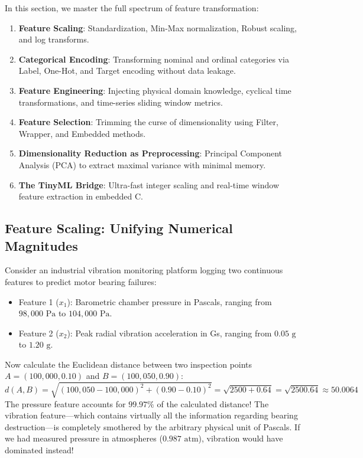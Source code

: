 In this section, we master the full spectrum of feature transformation:
\begin{enumerate}
    \item \textbf{Feature Scaling}: Standardization, Min-Max normalization, Robust scaling, and log transforms.
    \item \textbf{Categorical Encoding}: Transforming nominal and ordinal categories via Label, One-Hot, and Target encoding without data leakage.
    \item \textbf{Feature Engineering}: Injecting physical domain knowledge, cyclical time transformations, and time-series sliding window metrics.
    \item \textbf{Feature Selection}: Trimming the curse of dimensionality using Filter, Wrapper, and Embedded methods.
    \item \textbf{Dimensionality Reduction as Preprocessing}: Principal Component Analysis (PCA) to extract maximal variance with minimal memory.
    \item \textbf{The TinyML Bridge}: Ultra-fast integer scaling and real-time window feature extraction in embedded C.
\end{enumerate}

\subsection{Feature Scaling: Unifying Numerical Magnitudes}\label{subsec:feature_scaling}

Consider an industrial vibration monitoring platform logging two continuous features to predict motor bearing failures:
\begin{itemize}
    \item Feature 1 ($x_1$): Barometric chamber pressure in Pascals, ranging from $98{,}000\text{ Pa}$ to $104{,}000\text{ Pa}$.
    \item Feature 2 ($x_2$): Peak radial vibration acceleration in Gs, ranging from $0.05\text{ g}$ to $1.20\text{ g}$.
\end{itemize}

Now calculate the Euclidean distance between two inspection points $A = (100{,}000, 0.10)$ and $B = (100{,}050, 0.90)$:
\begin{equation*}
d(A, B) = \sqrt{(100{,}050 - 100{,}000)^2 + (0.90 - 0.10)^2} = \sqrt{2500 + 0.64} = \sqrt{2500.64} \approx 50.0064
\end{equation*}
The pressure feature accounts for $99.97\%$ of the calculated distance! The vibration feature---which contains virtually all the information regarding bearing destruction---is completely smothered by the arbitrary physical unit of Pascals. If we had measured pressure in atmospheres ($0.987\text{ atm}$), vibration would have dominated instead!

